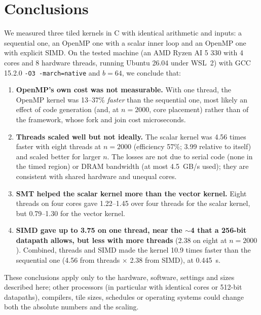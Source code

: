 \documentclass[conference,a4paper]{IEEEtran}
\newcommand{\code}[1]{\texttt{#1}}
\begin{document}
\section{Conclusions}
\label{sec:conclusions}
We measured three tiled kernels in C with identical arithmetic and inputs: a
sequential one, an OpenMP one with a scalar inner loop and an OpenMP one with
explicit SIMD. On the tested machine (an AMD Ryzen AI 5 330 with 4 cores and 8
hardware threads, running Ubuntu 26.04 under WSL~2) with GCC 15.2.0
\code{-O3 -march=native} and $b = 64$, we conclude that:
\begin{enumerate}[itemsep=1pt]
  \item \textbf{OpenMP's own cost was not measurable.} With one thread, the
        OpenMP kernel was 13--37\% \emph{faster} than the sequential one,
        most likely an effect of code generation (and, at $n = 2000$, core
        placement) rather than of the framework, whose fork and join cost
        microseconds.
  \item \textbf{Threads scaled well but not ideally.} The scalar kernel was
        4.56 times faster with eight threads at $n = 2000$ (efficiency 57\%;
        3.99 relative to itself) and scaled better for larger $n$. The losses
        are not due to serial code (none in the timed region) or DRAM
        bandwidth (at most 4.5~GB/s used); they are consistent with shared
        hardware and unequal cores.
  \item \textbf{SMT helped the scalar kernel more than the vector kernel.}
        Eight threads on four cores gave 1.22--1.45 over four threads for the
        scalar kernel, but 0.79--1.30 for the vector kernel.
  \item \textbf{SIMD gave up to 3.75 on one thread, near the $\sim$4 that a
        256-bit datapath allows, but less with more threads} (2.38 on eight
        at $n = 2000$). Combined, threads and SIMD made the kernel 10.9 times
        faster than the sequential one (4.56 from threads $\times$ 2.38 from
        SIMD), at 0.445~s.
\end{enumerate}
These conclusions apply only to the hardware, software, settings and sizes
described here; other processors (in particular with identical cores or
512-bit datapaths), compilers, tile sizes, schedules or operating systems
could change both the absolute numbers and the scaling.

\end{document}
